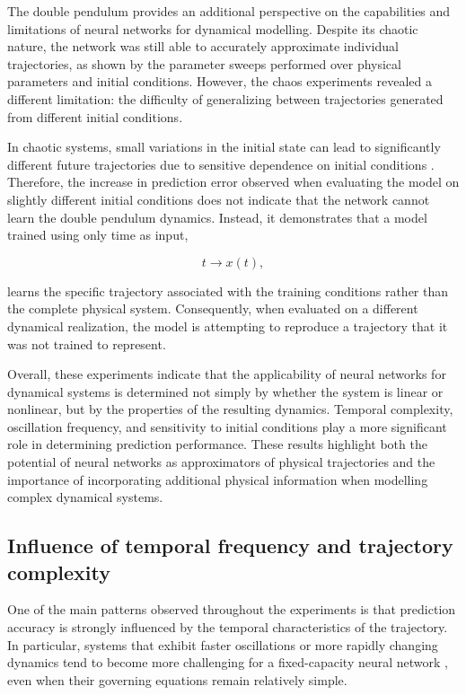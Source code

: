 The double pendulum provides an additional perspective on the capabilities and limitations of neural networks for dynamical modelling. Despite its chaotic nature, the network was still able to accurately approximate individual trajectories, as shown by the parameter sweeps performed over physical parameters and initial conditions. However, the chaos experiments revealed a different limitation: the difficulty of generalizing between trajectories generated from different initial conditions.

In chaotic systems, small variations in the initial state can lead to significantly different future trajectories due to sensitive dependence on initial conditions \cite{lorenz1963deterministic, strogatz2015nonlinear}. Therefore, the increase in prediction error observed when evaluating the model on slightly different initial conditions does not indicate that the network cannot learn the double pendulum dynamics. Instead, it demonstrates that a model trained using only time as input,

\begin{equation}
   t \rightarrow x(t),
 \label{eq:input_output}
\end{equation}

learns the specific trajectory associated with the training conditions rather than the complete physical system. Consequently, when evaluated on a different dynamical realization, the model is attempting to reproduce a trajectory that it was not trained to represent.

Overall, these experiments indicate that the applicability of neural networks for dynamical systems is determined not simply by whether the system is linear or nonlinear, but by the properties of the resulting dynamics. Temporal complexity, oscillation frequency, and sensitivity to initial conditions play a more significant role in determining prediction performance. These results highlight both the potential of neural networks as approximators of physical trajectories and the importance of incorporating additional physical information when modelling complex dynamical systems.

\subsection{Influence of temporal frequency and trajectory complexity}
One of the main patterns observed throughout the experiments is that prediction accuracy is strongly influenced by the temporal characteristics of the trajectory. In particular, systems that exhibit faster oscillations or more rapidly changing dynamics tend to become more challenging for a fixed-capacity neural network \cite{cybenko1989approximation}, even when their governing equations remain relatively simple.

